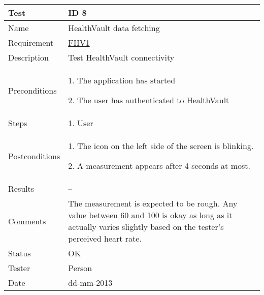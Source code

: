 \begin{table}
\begin{center}
\begin{tabular}{ | l | p{10cm} | }
	\hline
	\textbf{Test}	&	\textbf{ID 8} \\
	\hline\noalign{\smallskip}\noalign{\smallskip}\hline
	Name				& HealthVault data fetching \\
	Requirement			& \hyperref[table:reqweight]{FHV1} \\
	Description			& Test HealthVault connectivity \\
	Preconditions		&	\par 1. The application has started
							\par 2. The user has authenticated to HealthVault \\
	Steps 				&	\par 1. User \\
	Postconditions		&	\par 1. The icon on the left side of the screen is blinking.
							\par 2. A measurement appears after 4 seconds at most.\\
	Results				& -- \\
	Comments			&	The measurement is expected to be rough.
							Any value between 60 and 100 is okay as long as it actually varies slightly based
							on the tester's perceived heart rate.  \\
	Status				& OK \\
	Tester				& Person \\
	Date				& dd-mm-2013 \\
	\hline
\end{tabular}
\end{center}
\end{table}

